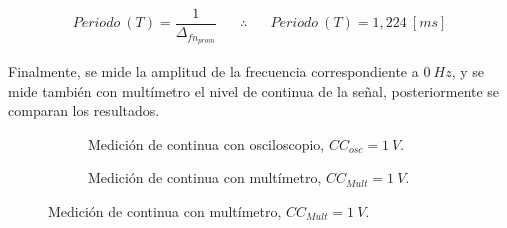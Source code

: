       \begin{align*}
        Periodo~\left( T \right)=\dfrac{1}{\Delta_{fn_{prom}}} \hspace{20pt} \therefore \hspace{20pt} \boxed{Periodo~\left( T \right)=1,224~[ms]}
      \end{align*}

      Finalmente, se mide la amplitud de la frecuencia correspondiente a $0~Hz$, y se mide 
      también con multímetro el nivel de continua de la señal, posteriormente se comparan 
      los resultados.

       \begin{figure}[H]
        \centering
        \begin{subfigure}[H]{0.48\textwidth}
          \caption{Medición de continua con osciloscopio, $CC_{osc}=1~V$.}
        \end{subfigure}
        \hfill
        \begin{subfigure}[H]{0.48\textwidth}
          \caption{Medición de continua con multímetro, $CC_{Mult}=1~V$.}
        \end{subfigure}


\end{figure}

